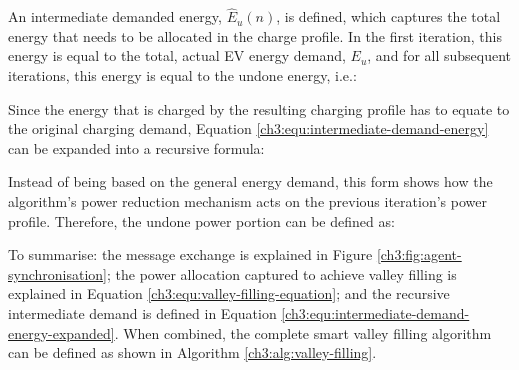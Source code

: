 

An intermediate demanded energy, $\hat{E}_u(n)$, is defined, which captures the total energy that needs to be allocated in the charge profile.
In the first iteration, this energy is equal to the total, actual EV energy demand, $E_u$, and for all subsequent iterations, this energy is equal to the undone energy, i.e.:



Since the energy that is charged by the resulting charging profile has to equate to the original charging demand, Equation \ref{ch3:equ:intermediate-demand-energy} can be expanded into a recursive formula:



Instead of being based on the general energy demand, this form shows how the algorithm's power reduction mechanism acts on the previous iteration's power profile.
Therefore, the undone power portion can be defined as:



To summarise: the message exchange is explained in Figure \ref{ch3:fig:agent-synchronisation}; the power allocation captured to achieve valley filling is explained in Equation \ref{ch3:equ:valley-filling-equation}; and the recursive intermediate demand is defined in Equation \ref{ch3:equ:intermediate-demand-energy-expanded}.
When combined, the complete smart valley filling algorithm can be defined as shown in Algorithm \ref{ch3:alg:valley-filling}.
















